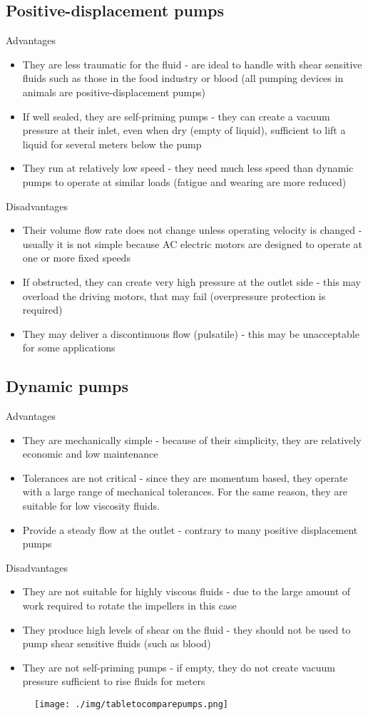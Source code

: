 \subsection{Positive-displacement pumps}
Advantages
\begin{itemize}
  \item They are less traumatic for the fluid - are ideal to handle with shear sensitive fluids such as those in the food industry or blood (all pumping devices in animals are positive-displacement pumps)
  \item If well sealed, they are self-priming pumps - they can create a vacuum pressure at their inlet, even when dry (empty of liquid), sufficient to lift a liquid for several meters below the pump
  \item They run at relatively low speed - they need much less speed than dynamic pumps to operate at similar loads (fatigue and wearing are more reduced)
\end{itemize}
Disadvantages
\begin{itemize}
  \item Their volume flow rate does not change unless operating velocity is changed - usually it is not simple because AC electric motors are designed to operate at one or more fixed speeds
  \item If obstructed, they can create very high pressure at the outlet side - this may overload the driving motors, that may fail (overpressure protection is required)
  \item They may deliver a discontinuous flow (pulsatile) - this may be unacceptable for some applications
\end{itemize}
\subsection{Dynamic pumps}
Advantages
\begin{itemize}
  \item They are mechanically simple - because of their simplicity, they are relatively economic and low maintenance
  \item Tolerances are not critical - since they are momentum based, they operate with a large range of mechanical tolerances. For the same reason, they are suitable for low viscosity fluids.
  \item Provide a steady flow at the outlet - contrary to many positive displacement pumps
\end{itemize}
Disadvantages
\begin{itemize}
  \item They are not suitable for highly viscous fluids - due to the large amount of work required to rotate the impellers in this case
  \item They produce high levels of shear on the fluid - they should not be used to pump shear sensitive fluids (such as blood)
  \item They are not self-priming pumps - if empty, they do not create vacuum pressure sufficient to rise fluids for meters
\end{itemize}
\begin{figure}[H]
  \centering
  \texttt{[image: ./img/tabletocomparepumps.png]}
\end{figure}
